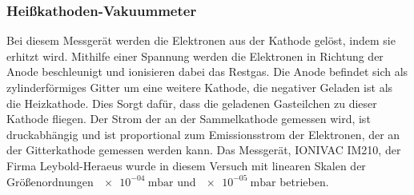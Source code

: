 \subsubsection{Heißkathoden-Vakuummeter}
Bei diesem Messgerät werden die Elektronen aus der Kathode gelöst, indem sie erhitzt wird. Mithilfe einer Spannung werden die Elektronen in Richtung der Anode beschleunigt und ionisieren dabei das Restgas. Die Anode befindet sich als zylinderförmiges Gitter um eine weitere Kathode, die negativer Geladen ist als die Heizkathode. Dies Sorgt dafür, dass die geladenen Gasteilchen zu dieser Kathode fliegen. Der Strom der an der Sammelkathode gemessen wird, ist druckabhängig und ist proportional zum Emissionsstrom der Elektronen, der an der Gitterkathode gemessen werden kann\cite{Pfeifer13}. Das Messgerät, IONIVAC IM210, der Firma Leybold-Heraeus wurde in diesem Versuch mit linearen Skalen der Größenordnungen $\SI{e-04}{\milli\bar}$ und $\SI{e-05}{\milli\bar}$ betrieben.
